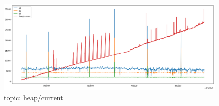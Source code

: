 \documentclass[12pt, letterpaper]{article}
\begin{document}
\begin{figure}
	\setlength{\tabcolsep}{0pt}
	\caption{topic: heap/current}
	\label{f:valid_cnt_heap_current}
	\begin{center}
		\includegraphics[width=\textwidth]{valid_cnt/valid_cnt-heap_current}	
	\end{center}
\end{figure}
\end{document}
